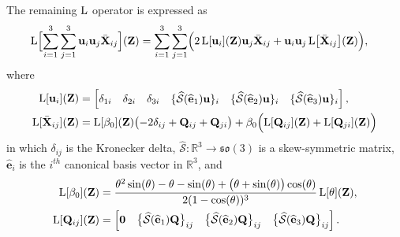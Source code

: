 The remaining $\operatorname{L}$ operator is expressed as
\begin{align}
    \operatorname{L}\Bigl[\sum_{i=1}^{3}\sum_{j=1}^{3}\mathbf{u}_i\mathbf{u}_j\bar{\mathbf{X}}_{ij}\Bigr](\mathbf{Z}) =  \sum_{i=1}^{3}\sum_{j=1}^{3}& \Bigl(2\operatorname{L}[\mathbf{u}_{i}](\mathbf{Z})\mathbf{u}_{j}\bar{\mathbf{X}}_{ij}
     +\mathbf{u}_{i}\mathbf{u}_{j}\operatorname{L}\bigl[\bar{\mathbf{X}}_{ij}\bigr](\mathbf{Z})\Bigr),
\end{align}
where
\begin{align}
    \operatorname{L}[\mathbf{u}_{i}](\mathbf{Z}) &= \begin{bmatrix}
        \delta_{1i} & \delta_{2i} & \delta_{3i} & \{\widehat{\mathcal{S}}(\widehat{\mathbf{e}}_1)\mathbf{u}\}_i & \{\widehat{\mathcal{S}}(\widehat{\mathbf{e}}_2)\mathbf{u}\}_i & \{\widehat{\mathcal{S}}(\widehat{\mathbf{e}}_3)\mathbf{u}\}_i 
    \end{bmatrix},\label{eq:explicit-EE-dista-SE3-component-Lui}\\
    \operatorname{L}[\bar{\mathbf{X}}_{ij}](\mathbf{Z}) &= \operatorname{L}[\beta_0](\mathbf{Z})\bigl(-2\delta_{ij}+ \mathbf{Q}_{ij} + \mathbf{Q}_{ji}\bigr) + \beta_0\Bigl(\operatorname{L}[\mathbf{Q}_{ij}](\mathbf{Z}) + \operatorname{L}[\mathbf{Q}_{ji}](\mathbf{Z})\Bigr) \label{eq:explicit-EE-dista-SE3-component-Xij}
\end{align}
in which $\delta_{ij}$ is the Kronecker delta, $\widehat{\mathcal{S}}:\mathbb{R}^3\to\mathfrak{so}(3)$ is a skew-symmetric matrix, $\widehat{\mathbf{e}}_i$ is the $i^{th}$ canonical basis vector in $\mathbb{R}^3$, and
\begin{align}
    \operatorname{L}[\beta_0](\mathbf{Z}) &= \frac{\theta^2\sin(\theta) - \theta - \sin(\theta) + \bigl(\theta + \sin(\theta)\bigr) \cos(\theta)}{2 (1 - \cos(\theta))^3} \operatorname{L}[\theta](\mathbf{Z}), \label{eq:explicit-EE-dista-SE3-component-Lbeta}\\
    \operatorname{L}[\mathbf{Q}_{ij}](\mathbf{Z}) &= \begin{bmatrix}
        \mathbf{0} & \bigl\{\widehat{\mathcal{S}}(\widehat{\mathbf{e}}_1)\mathbf{Q}\bigr\}_{ij} & \bigl\{\widehat{\mathcal{S}}(\widehat{\mathbf{e}}_2)\mathbf{Q}\bigr\}_{ij} & \bigl\{\widehat{\mathcal{S}}(\widehat{\mathbf{e}}_3)\mathbf{Q}\bigr\}_{ij}
    \end{bmatrix}. \label{eq:explicit-EE-dista-SE3-component-LQij}
\end{align}

